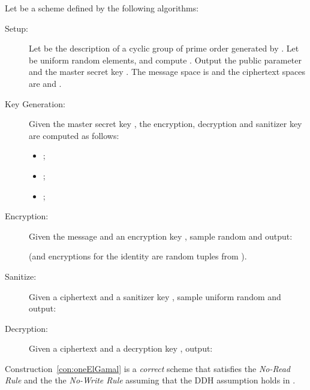 \documentclass{llncs}
\begin{document}
\begin{construction} \label{con:oneElGamal}
Let  be a \oACE scheme defined by the following algorithms:
\end{construction}
\begin{description}
\item[Setup:] Let  be the description of a cyclic group of prime order  generated by . Let  be uniform random elements, and compute . Output the public parameter   and the master secret key . The message space is  and the ciphertext spaces are  and .

\item[Key Generation:] Given the master secret key , the encryption, decryption and sanitizer key are computed as follows:
	\begin{itemize}
	\item ;
	\item ;
	\item ;
	\end{itemize}

\item[Encryption:] Given the message  and an encryption key , sample random  and output:

(and encryptions for the identity  are random tuples from ).

\item[Sanitize:] Given a ciphertext  and a sanitizer key , sample uniform random  and output:


\item[Decryption:] Given a ciphertext  and a decryption key , output:

\end{description}




\begin{lem}\label{lem:elgamal}
Construction~\ref{con:oneElGamal} is a \emph{correct} \oACE scheme that satisfies the \emph{No-Read Rule} and the the \emph{No-Write Rule} assuming that the DDH assumption holds in .
\end{lem}
\end{document}
